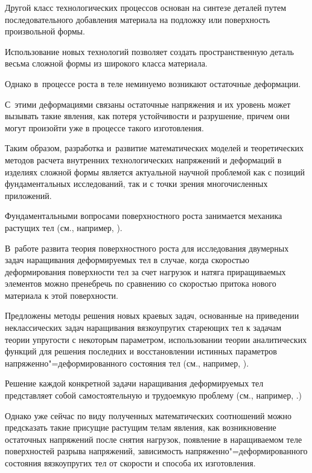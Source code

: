 Другой класс технологических процессов основан на синтезе деталей путем последовательного добавления материала на подложку или поверхность произвольной формы. 



Использование новых технологий  позволяет создать пространственную деталь весьма сложной формы из широкого класса материала. 

Однако в~процессе роста в теле неминуемо возникают остаточные деформации. 

С~этими деформациями связаны остаточные напряжения и их уровень может вызывать такие явления, как потеря устойчивости и разрушение, причем они могут произойти уже в процессе такого изготовления. 

Таким образом, разработка и~развитие математических моделей и теоретических методов расчета внутренних технологических напряжений и деформаций в изделиях сложной формы является актуальной научной проблемой как с позиций фундаментальных исследований, так и с точки зрения многочисленных приложений.



Фундаментальными вопросами поверхностного роста занимается механика растущих тел (см., например, \cite{Manzh_bib_01,Manzh_bib_02,Manzh_bib_03,Manzh_bib_022,Manzh_bib_033}). 

В~работе \cite{Manzh_bib_01} развита теория поверхностного роста для исследования двумерных задач наращивания деформируемых тел в случае, когда скоростью деформирования поверхности тел за счет нагрузок и натяга приращиваемых элементов можно пренебречь по сравнению со скоростью притока нового материала к этой поверхности. 

Предложены методы решения новых краевых задач, основанные на приведении неклассических задач наращивания вязкоупругих стареющих тел к задачам теории упругости с некоторым параметром, использовании теории аналитических функций для решения последних и восстановлении истинных параметров напряженно"=деформированного состояния тел (см., например, \cite{Manzh_bib_04,Manzh_bib_05,Manzh_bib_06,Manzh_bib_07,Manzh_bib_08}).



Решение каждой конкретной задачи наращивания деформируемых тел представляет собой самостоятельную и трудоемкую проблему (см., например, \cite{Manzh_bib_10,Manzh_bib_11,Manzh_bib_12}.) 

Однако уже сейчас по виду полученных математических соотношений можно предсказать такие присущие растущим телам явления, как возникновение остаточных напряжений после снятия нагрузок, появление в наращиваемом теле поверхностей разрыва напряжений, зависимость напряженно"=деформированного состояния вязкоупругих тел от скорости и способа их изготовления.



